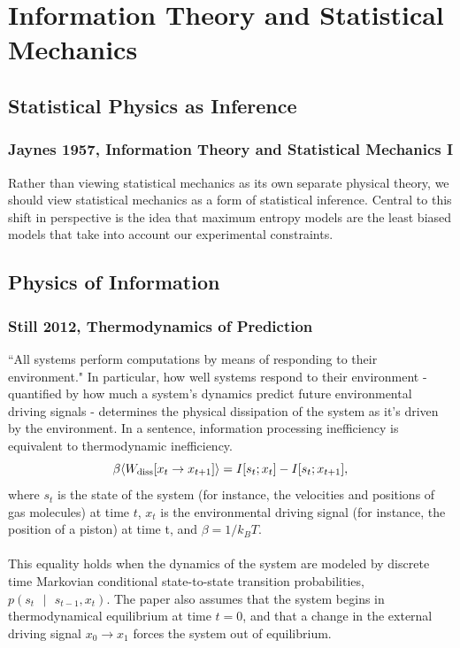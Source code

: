 \documentclass{article}
\newcommand{\given}{\mbox{ } | \mbox{ }}
\begin{document}
\section{Information Theory and Statistical Mechanics}

\subsection{Statistical Physics as Inference}
\subsubsection{Jaynes 1957, Information Theory and Statistical Mechanics I}
Rather than viewing statistical mechanics as its own separate physical theory, we should view statistical mechanics as a form of statistical inference.  Central to this shift in perspective is the idea that maximum entropy models are the least biased models that take into account our experimental constraints.

\subsection{Physics of Information}
\subsubsection{Still 2012, Thermodynamics of Prediction}
``All systems perform computations by means of responding to their environment."  In particular, how well systems respond to their environment - quantified by how much a system's dynamics predict future environmental driving signals - determines the physical dissipation of the system as it's driven by the environment.  In a sentence, information processing inefficiency is equivalent to thermodynamic inefficiency.
\begin{equation}
\beta \langle W_{\rm diss} [x_t \to x_{t + 1}] \rangle = I[s_t; x_t] - I[s_t; x_{t + 1}],
\end{equation}
where $s_t$ is the state of the system (for instance, the velocities and positions of gas molecules) at time $t$, $x_t$ is the environmental driving signal (for instance, the position of a piston) at time t, and $\beta = 1/k_B T$. \\
\\
This equality holds when the dynamics of the system are modeled by discrete time Markovian conditional state-to-state transition probabilities, $p(s_t \given s_{t - 1}, x_t)$.  The paper also assumes that the system begins in thermodynamical equilibrium at time $t = 0$, and that a change in the external driving signal $x_0 \to x_1$ forces the system out of equilibrium.
\end{document}
